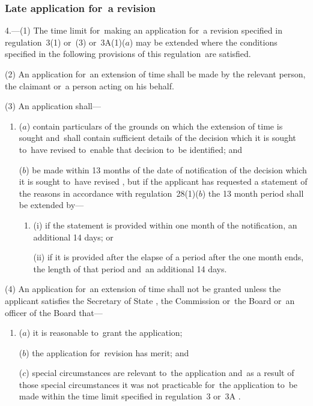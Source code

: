 \documentclass[12pt,a4paper]{article}
\begin{document}
\subsubsection[4. Late application for~a revision]{Late application for~a revision}

4.—(1) The time limit for~making an application for~a revision specified in regulation~3(1) or~(3) 
or~3A(1)($a$)  %
may be extended where the conditions specified in the following provisions of this regulation~are satisfied.

(2) An application for~an extension of time shall be made by 
the relevant person,  %
the claimant or~a person acting on his behalf.

(3) An application shall—
\begin{enumerate}\item[]
($a$) contain particulars of the grounds on which the extension of time is sought and~shall contain sufficient details of the decision which it is sought to~have revised to~enable that decision to~be identified; and

($b$) be made within 13 months of the date of notification of the decision which it is sought to~have revised%
, but if the applicant has requested a statement of the reasons in accordance with regulation~28(1)($b$)  the 13 month period shall be extended by—
\begin{enumerate}\item[]
(i) if the statement is provided within one month of the notification, an additional 14 days; or

(ii) if it is provided after the elapse of a period after the one month ends, the length of that period and~an additional 14 days.
\end{enumerate}  %
\end{enumerate}

(4) An application for~an extension of time shall not be granted unless the applicant satisfies the Secretary of State%
, the Commission
or~the Board or~an officer of the Board  %
that—
\begin{enumerate}\item[]
($a$) it is reasonable to~grant the application;

($b$) the application for~revision has merit; and

($c$) special circumstances are relevant to~the application and~as a result of those special circumstances it was not practicable for~the application to~be made within the time limit specified in regulation~3 
or~3A%
.
\end{enumerate}
\end{document}
